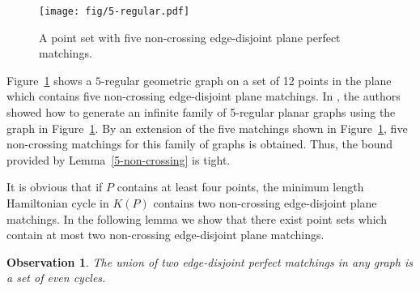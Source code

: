 \documentclass[11pt,a4paper]{article}
\newcommand{\Kn}[1]{K#1}
\newtheorem{observation}{Observation}
\begin{document}
\begin{figure}[htb]
  \centering
  \texttt{[image: fig/5-regular.pdf]}
 \caption{A point set with five non-crossing edge-disjoint plane perfect matchings.}
  \label{5-regular-fig}
\end{figure}

Figure~\ref{5-regular-fig} shows a $5$-regular geometric graph on a set of 12 points in the plane which contains five non-crossing edge-disjoint plane matchings. In \cite{Hasheminezhad2011}, the authors showed how to generate an infinite family of 5-regular planar graphs using the graph in Figure~\ref{5-regular-fig}. By an extension of the five matchings shown in Figure~\ref{5-regular-fig}, five non-crossing matchings for this family of graphs is obtained. Thus, the bound provided by Lemma~\ref{5-non-crossing} is tight.  

It is obvious that if $P$ contains at least four points, the minimum length Hamiltonian cycle in $\Kn{(P)}$ contains two non-crossing edge-disjoint plane matchings. In the following lemma we show that there exist point sets which contain at most two non-crossing edge-disjoint plane matchings.


\begin{observation}
\label{even-cycle-obs}
The union of two edge-disjoint perfect matchings in any graph is a set of even cycles.
\end{observation}
\end{document}
